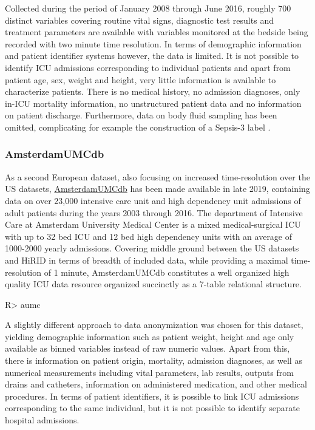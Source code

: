 \documentclass[
]{jss}
\begin{document}
Collected during the period of January 2008 through June 2016, roughly
700 distinct variables covering routine vital signs, diagnostic test
results and treatment parameters are available with variables monitored
at the bedside being recorded with two minute time resolution. In terms
of demographic information and patient identifier systems however, the
data is limited. It is not possible to identify ICU admissions
corresponding to individual patients and apart from patient age, sex,
weight and height, very little information is available to characterize
patients. There is no medical history, no admission diagnoses, only
in-ICU mortality information, no unstructured patient data and no
information on patient discharge. Furthermore, data on body fluid
sampling has been omitted, complicating for example the construction of
a Sepsis-3 label \citep{singer2016}.

\hypertarget{amsterdamumcdb}{%
\subsubsection{AmsterdamUMCdb}\label{amsterdamumcdb}}

As a second European dataset, also focusing on increased time-resolution
over the US datasets,
\href{https://amsterdammedicaldatascience.nl/\#amsterdamumcdb}{AmsterdamUMCdb}
has been made available in late 2019, containing data on over 23,000
intensive care unit and high dependency unit admissions of adult
patients during the years 2003 through 2016. The department of Intensive
Care at Amsterdam University Medical Center is a mixed medical-surgical
ICU with up to 32 bed ICU and 12 bed high dependency units with an
average of 1000-2000 yearly admissions. Covering middle ground between
the US datasets and HiRID in terms of breadth of included data, while
providing a maximal time-resolution of 1 minute, AmsterdamUMCdb
constitutes a well organized high quality ICU data resource organized
succinctly as a 7-table relational structure.

\begin{CodeChunk}
\begin{CodeInput}
R> aumc
\end{CodeInput}
\end{CodeChunk}

A slightly different approach to data anonymization was chosen for this
dataset, yielding demographic information such as patient weight, height
and age only available as binned variables instead of raw numeric
values. Apart from this, there is information on patient origin,
mortality, admission diagnoses, as well as numerical measurements
including vital parameters, lab results, outputs from drains and
catheters, information on administered medication, and other medical
procedures. In terms of patient identifiers, it is possible to link ICU
admissions corresponding to the same individual, but it is not possible
to identify separate hospital admissions.
\end{document}

